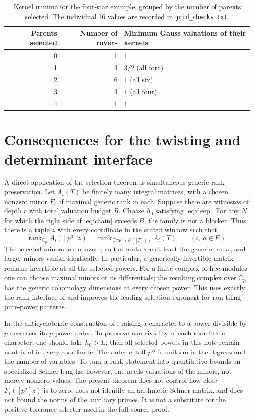 \documentclass[11pt]{article}
\theoremstyle{definition}
\newcommand{\Cp}{\mathbb C_p}
\newcommand{\OO}{\mathcal O}
\newcommand{\rank}{\operatorname{rank}}
\begin{document}
\begin{table}[htbp]
\centering
\caption{Kernel minima for the four-star example, grouped by the number of parents selected. The individual 16 values are recorded in \texttt{grid\_checks.txt}.}
\begin{tabular}{rrl}
\toprule
Parents selected&Number of covers&Minimum Gauss valuations of their kernels\\\midrule
0&1&$1$\\
1&4&$3/2$ (all four)\\
2&6&$1$ (all six)\\
3&4&$1$ (all four)\\
4&1&$1$\\
\bottomrule
\end{tabular}
\end{table}

\section{Consequences for the twisting and determinant interface}

A direct application of the selection theorem is simultaneous generic-rank preservation. Let $A_i(T)$ be finitely many integral matrices, with a chosen nonzero minor $F_i$ of maximal generic rank in each. Suppose there are witnesses of depth $r$ with total valuation budget $B$. Choose $h_0$ satisfying \eqref{eq:deep}. For any $N$ for which the right side of \eqref{eq:chain} exceeds $B$, the family is not a blocker. Thus there is a tuple $z$ with every coordinate in the stated window such that
\[
 \rank_{\Cp} A_i([p^a]z)=\rank_{\operatorname{Frac}(\OO[[T]])} A_i(T)
 \qquad(i,\ a\in E).
\]
The selected minors are nonzero, so the ranks are at least the generic ranks, and larger minors vanish identically. In particular, a generically invertible matrix remains invertible at all the selected powers. For a finite complex of free modules one can choose maximal minors of its differentials; the resulting complex over $\Cp$ has the generic cohomology dimensions at every chosen power. This uses exactly the rank interface of \cite{tors} and improves the leading selection exponent for non-tiling pure-power patterns.

In the anticyclotomic construction of \cite{roots,source}, raising a character to a power divisible by $p$ decreases its $p$-power order. To preserve nontriviality of each coordinate character, one should take $h_0>L$; then all selected powers in this note remain nontrivial in every coordinate. The order cutoff $p^H$ is uniform in the degrees and the number of variables. To turn a rank statement into quantitative bounds on specialized Selmer lengths, however, one needs valuations of the minors, not merely nonzero values. The present theorem does not control how close $F_i([p^a]z)$ is to zero, does not identify an arithmetic Selmer matrix, and does not bound the norms of the auxiliary primes. It is not a substitute for the positive-tolerance selector used in the full source proof.
\end{document}
